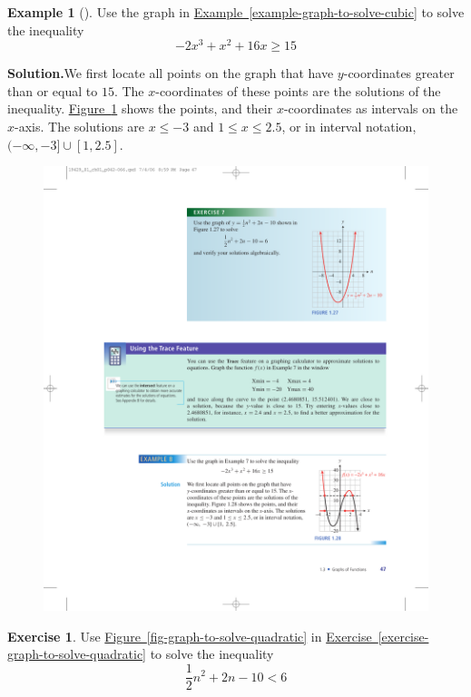 \documentclass[10pt,]{book}
\theoremstyle{plain}
\theoremstyle{definition}
\theoremstyle{definition}
\newtheorem{example}[theorem]{Example}
\theoremstyle{definition}
\theoremstyle{definition}
\newtheorem{exercise}[theorem]{Exercise}
\numberwithin{equation}{part}
\newcommand{\lt}{<}
\begin{document}
\begin{example}[]\label{example-graph-to-solve-cubic2}
Use the graph in \hyperref[example-graph-to-solve-cubic]{Example~\ref{example-graph-to-solve-cubic}}  to solve the inequality%
\begin{equation*}
-2x^3 + x^2 + 16x \ge 15
\end{equation*}
%
\par\medskip\noindent%
\textbf{Solution.}\quad We first locate all points on the graph that have \(y\)-coordinates greater than or equal to \(15\). The \(x\)-coordinates of these points are the solutions of the inequality. \hyperref[fig-graph-to-solve-cubic2]{Figure~\ref{fig-graph-to-solve-cubic2}} shows the points, and their \(x\)-coordinates as intervals on the \(x\)-axis. The solutions are \(x \le -3\) and \(1\le x \le 2.5\), or in interval notation, \((-∞, -3] ∪ [1, 2.5]\). \begin{figure}
\centering
\includegraphics[width=0.6\linewidth]{images/fig-graph-to-solve-cubic2}
\caption{\label{fig-graph-to-solve-cubic2}}
\end{figure}
%
\end{example}
\begin{exercise}\label{exercise-graph-to-solve-quadratic2}
Use \hyperref[fig-graph-to-solve-quadratic]{Figure~\ref{fig-graph-to-solve-quadratic}} in \hyperref[exercise-graph-to-solve-quadratic]{Exercise~\ref{exercise-graph-to-solve-quadratic}} to solve the inequality%
\begin{equation*}
\frac{1}{2}n^2 + 2n - 10 \lt 6
\end{equation*}
\end{exercise}
\typeout{************************************************}
\typeout{************************************************}
\end{document}
